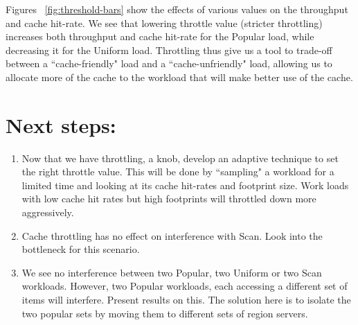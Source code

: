 \documentclass[twocolumn]{article}
\begin{document}
Figures ~\ref{fig:threshold-bars} show the effects of various values on the throughput and cache hit-rate. We see that lowering throttle value (stricter throttling) increases both throughput and cache hit-rate for the Popular load, while decreasing it for the Uniform load. Throttling thus give us a tool to trade-off between a ``cache-friendly" load and a ``cache-unfriendly" load, allowing us to allocate more of the cache to the workload that will make better use of the cache.


\section{Next steps:}
\begin{enumerate}
\item Now that we have throttling, a knob, develop an adaptive technique to set the right throttle value.
 This will be done by ``sampling" a workload for a limited time and looking at its cache hit-rates and footprint size. Work loads with low cache hit rates but high footprints will throttled down more aggressively. 
 
 \item Cache throttling has no effect on interference with Scan. Look into the bottleneck for this scenario.
 
 \item We see no interference between two Popular, two Uniform or two Scan workloads. However, two Popular workloads, each accessing a different set of items will interfere. Present results on this. The solution here is to isolate the two popular sets by moving them to different sets of region servers.
\end{enumerate}




\footnotesize

\end{document}
